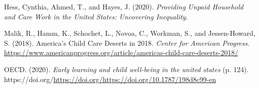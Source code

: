 \documentclass[
  11pt,
]{article}
\newlength{\cslhangindent}
\newenvironment{CSLReferences}[2] %
 {\begin{list}{}{%
  \setlength{\itemindent}{0pt}
  \setlength{\leftmargin}{0pt}
  \setlength{\parsep}{0pt}
  \ifodd #1
   \setlength{\leftmargin}{\cslhangindent}
   \setlength{\itemindent}{-1\cslhangindent}
  \fi
  \setlength{\itemsep}{#2\baselineskip}}}
 {\end{list}}
\begin{document}
\begin{CSLReferences}{1}{0}
Hess, Cynthia, Ahmed, T., and Hayes, J. (2020). \emph{Providing {Unpaid}
{Household} and {Care} {Work} in the {United} {States}: {Uncovering}
{Inequality}}.

Malik, R., Hamm, K., Schochet, L., Novoa, C., Workman, S., and
Jessen-Howard, S. (2018). America's {Child} {Care} {Deserts} in 2018.
\emph{Center for American Progress}.
\url{https://www.americanprogress.org/article/americas-child-care-deserts-2018/}

OECD. (2020). \emph{Early learning and child well-being in the united
states} (p. 124).
https://doi.org/\url{https://doi.org/https://doi.org/10.1787/198d8c99-en}

\end{CSLReferences}
\end{document}
